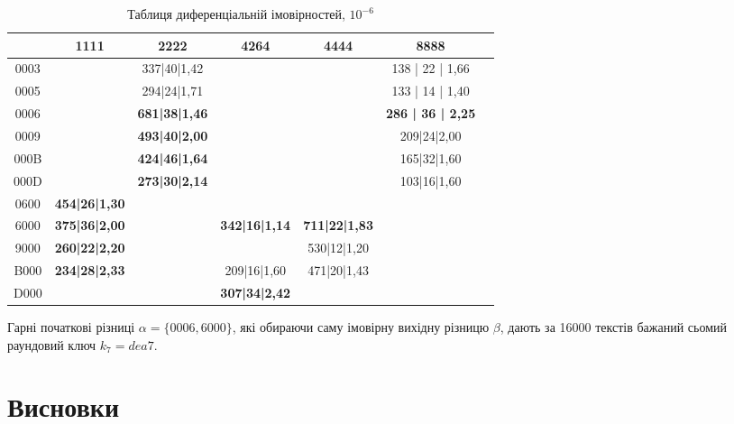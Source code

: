 \documentclass[12pt,a4paper]{article}
\begin{document}
\begin{table}[]
\centering
\begin{tabular}{|c|c|c|c|c|c|c|}
\hline
\backslashbox{$\alpha$}{$\beta$}       & 1111                        & 2222                                               & 4264                        & 4444                        & 8888                        \\ \hline
0003 &                               & 337|40|1,42          &                                                             &                               & 138 | 22 | 1,66          \\ \hline
0005 & \textbf{}                     & 294|24|1,71          & \textbf{}                                          &                               & 133 | 14 | 1,40          \\ \hline
0006 &                               & \textbf{681|38|1,46} &                                                             &                               & \textbf{286 | 36 | 2,25} \\ \hline
0009 &                               & \textbf{493|40|2,00} &                                                              &                               & 209|24|2,00          \\ \hline
000B &                               & \textbf{424|46|1,64} &                                                              &                               & 165|32|1,60          \\ \hline
000D & \textbf{}                     & \textbf{273|30|2,14} & \textbf{}                                          & \textbf{}                     & 103|16|1,60          \\ \hline
0600 & \textbf{454|26|1,30} &            &                                                              &                               &                               \\ \hline
6000 & \textbf{375|36|2,00} &                                & \textbf{342|16|1,14} & \textbf{711|22|1,83} &                               \\ \hline
9000 & \textbf{260|22|2,20} &                                                             &                               & 530|12|1,20          &                               \\ \hline
B000 & \textbf{234|28|2,33} &                                                              & 209|16|1,60          & 471|20|1,43          &                               \\ \hline
D000 &                      &                                                       & \textbf{307|34|2,42} &                               \\ \hline
\end{tabular}
\caption{Таблиця диференціальній імовірностей, $10^{-6}$}
\label{tab:diffs}
\end{table}

Гарні початкові різниці $\alpha = \{0006,6000\}$, які обираючи саму імовірну вихідну різницю $\beta$, дають за 16000 текстів бажаний сьомий раундовий ключ $k_7 = dea7$. 


\section{Висновки}
\end{document}
